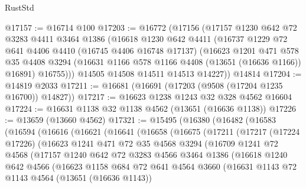 \begin{lexlean}{RustStd}
\begin{coremodule}
@17157 := @16714 @100
@17203 := @16772
    (@17156
      (@17157
        @1230
        @642
        @72
        @3283
        @4411
        @3464
        @1386
        (@16618
          @1230
          @642
          @4411
          (@16737
            @1229
            @72
            @641
            @4406
            @4410
            (@16745 @4406 @16748 @17137)
            (@16623
              @1201
              @471
              @578
              @35
              @4408
              @3294
              (@16631 @1166 @578 @1166 @4408 (@13651 (@16636 @1166)) @16891)
              @16755)))
        @14505
        @14508
        @14511
        @14513
        @14227))
    @14814
@17204 := @14819 @2033
@17211 := @16681 (@16691 (@17203 (@9508 (@17204 @1235 @16700)) @14827))
@17217 := @16623 @1238 @1243 @32 @328 @4562 @16604
@17224 := @16631 @1138 @32 @1138 @4562 (@13651 (@16636 @1138))
@17226 := @13659 (@13660 @4562)
@17321 := @15495
    (@16380
      (@16482
        (@16583
          (@16594
            (@16616
              (@16621
                (@16641
                  (@16658
                    (@16675
                      (@17211
                        (@17217
                          (@17224 @17226)
                          (@16623
                            @1241
                            @471
                            @72
                            @35
                            @4568
                            @3294
                            (@16709
                              @1241
                              @72
                              @4568
                              (@17157
                                @1240
                                @642
                                @72
                                @3283
                                @4566
                                @3464
                                @1386
                                (@16618
                                  @1240
                                  @642
                                  @4566
                                  (@16623
                                    @1158
                                    @684
                                    @72
                                    @641
                                    @4564
                                    @3660
                                    (@16631
                                      @1143
                                      @72
                                      @1143
                                      @4564
                                      (@13651 (@16636 @1143))

\end{coremodule}
\end{lexlean}
